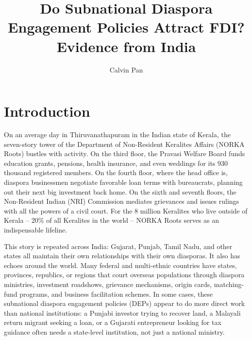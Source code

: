 \documentclass[doublespace,nopageskip]{UVAthesis}
\title{Do Subnational Diaspora Engagement Policies Attract FDI? Evidence from India}
\author{Calvin Pan}
\begin{document}
  \frontmatter
  \maketitle
  \tableofcontents
	\listoffigures
	\listoftables


	\mainmatter

\chapter{Introduction} \label{ch:introduction}	

On an average day in Thiruvanathapuram in the Indian state of Kerala, the seven-story tower of the Department of Non-Resident Keralites Affairs (NORKA Roots) bustles with activity. On the third floor, the Pravasi Welfare Board funds education grants, pensions, health insurance, and even weddings for its 930 thousand registered members. On the fourth floor, where the head office is, diaspora businessmen negotiate favorable loan terms with bureaucrats, planning out their next big investment back home. On the sixth and seventh floors, the Non-Resident Indian (NRI) Commission mediates grievances and issues rulings with all the powers of a civil court. For the 8 million Keralites who live outside of Kerala -- 20\% of all Keralites in the world -- NORKA Roots serves as an indispensable lifeline.

This story is repeated across India: Gujarat, Punjab, Tamil Nadu, and other states all maintain their own relationships with their own diasporas. It also has echoes around the world. Many federal and multi-ethnic countries have states, provinces, republics, or regions that court overseas populations through diaspora ministries, investment roadshows, grievance mechanisms, origin cards, matching-fund programs, and business facilitation schemes. In some cases, these subnational diaspora engagement policies (DEPs) appear to do more direct work than national institutions: a Punjabi investor trying to recover land, a Malayali return migrant seeking a loan, or a Gujarati entrepreneur looking for tax guidance often needs a state-level institution, not just a national ministry.
\end{document}
